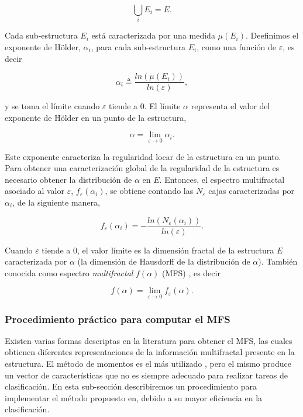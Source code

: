 \begin{equation}
\displaystyle\bigcup_{i}E_{i} = E.
\end{equation}

Cada sub-estructura $E_{i}$ está caracterizada por una medida $\mu(E_{i})$.
Deefinimos el exponente de H\"older, $\alpha_{i}$, para cada sub-estructura $E_{i}$, como una función de $\varepsilon$, es decir


\begin{equation}
\alpha_{i} \triangleq \frac{ln(\mu(E_{i}))}{ln(\varepsilon)},
\label{eqn:eqn4}
\end{equation}
\noindent

y se toma el límite cuando $\varepsilon$ tiende a $0$.
El límite $\alpha$ representa el valor del exponente de H\"older en un punto de la estructura, 

\begin{equation}
\alpha = \lim_{\varepsilon\to0}{\alpha_{i}}.
\label{eqn:eqn5}
\end{equation}

Este exponente caracteriza la regularidad locar de la estructura en un punto.
Para obtener una caracterización global de la regularidad de la estructura es necesario obtener la distribución de $\alpha$ en $E$.
Entonces, el espectro multifractal asociado al valor $\varepsilon$, $f_{\varepsilon}(\alpha_{i})$, se obtiene contando las $N_{\varepsilon}$ cajas caracterizadas por $\alpha_{i}$, de la siguiente manera,

\begin{equation}
f_{\varepsilon}(\alpha_{i}) = - \frac{ln(N_{\varepsilon}(\alpha_{i}))}{ln(\varepsilon)}.
\label{eqn:eqn6}
\end{equation}

Cuando $\varepsilon$ tiende a $0$, el valor límite es la dimensión fractal de la estructura $E$ caracterizada por $\alpha$ (la dimensión de Hausdorff de la distribución de $\alpha$).
También conocida como espectro {\em multifractal} $f(\alpha)$ (MFS) \cite{Silvetti2010}, es decir

\begin{equation}
f(\alpha) = \lim_{\varepsilon\to0}{f_{\varepsilon}(\alpha)}.
\label{eqn:eqn7}
\end{equation}

\subsubsection{Procedimiento práctico para computar el MFS}
Existen varias formas descriptas en la literatura para obtener el MFS, las cuales obtienen diferentes representaciones de la información multifractal presente en la estructura.
El método de momentos es el más utilizado \cite{Mendoza2010,Serrano2012}, pero el mismo produce un vector de características que no es siempre adecuado para realizar tareas de clasificación.
En esta sub-sección describiremos un procedimiento para implementar el método propuesto en\cite{Xu2009}, debido a su mayor eficiencia en la clasificación.

